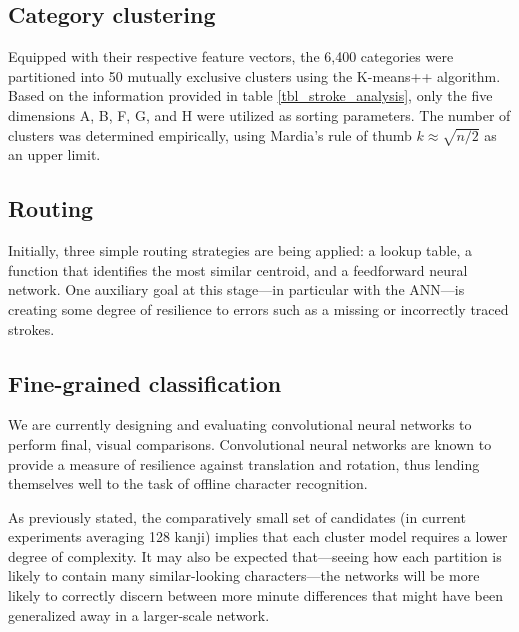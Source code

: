 \documentclass[10pt,conference,a4paper]{IEEEtran}
\begin{document}
	\subsection{Category clustering}

	Equipped with their respective feature vectors, the 6,400 categories were partitioned into 50
	mutually exclusive clusters using the K-means++ algorithm. \cite{arthur2007k}
	Based on the information provided
	in table \ref{tbl_stroke_analysis}, only the five dimensions A, B, F, G, and H were utilized as sorting parameters.
	The number of clusters was determined empirically, using Mardia's rule of thumb \mbox{$k \approx \sqrt{n / 2}$} \cite{mardia2005multivariate}
	as an upper limit.
	



	\subsection{Routing}

	Initially, three simple routing strategies are being applied: a lookup table, a function that
	identifies the most similar centroid, and a feedforward neural network. One auxiliary goal
	at this stage---in particular with the ANN---is creating some degree of resilience to errors
	such as a missing or incorrectly traced strokes.


	\subsection{Fine-grained classification}

	We are currently designing and evaluating convolutional neural networks to perform final, visual comparisons.
	\mbox{Convolutional} neural networks are known to provide a measure of resilience against translation and rotation,
	thus lending themselves well to the task of offline character recognition.
	
	As previously stated, the comparatively small set of candidates (in current experiments averaging 128 kanji)
	implies that each cluster model requires a lower degree of complexity. It may also be expected that---seeing
	how each partition is likely to contain many similar-looking characters---the networks will be more likely
	to correctly discern between more minute differences that might have been generalized away in a larger-scale network.
\end{document}
